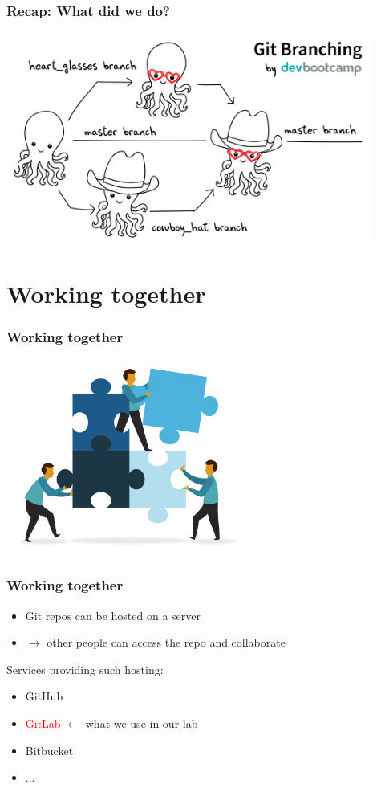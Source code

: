 \documentclass[aspectratio=169]{beamer}
\begin{document}

\begin{frame}
\frametitle{Recap: What did we do?}
\centering
\includegraphics[width=0.9\textwidth]{graphics/git_branching_octopus.png}
\end{frame}


\section{Working together}

\begin{frame}
\frametitle{Working together}
\centering
\includegraphics[width=0.6\textwidth]{graphics/collaboration.png}
\end{frame}


\begin{frame}
\frametitle{Working together}
\begin{itemize}
	\item Git repos can be hosted on a server
	\item $\rightarrow$ other people can access the repo and collaborate
\end{itemize}
\vspace{.5cm}
Services providing such hosting:
\begin{itemize}
	\item GitHub
	\item \textcolor{red}{GitLab} {\footnotesize  $\leftarrow$ what we use in our lab}
	\item Bitbucket
	\item ...
\end{itemize}
\end{frame}
\end{document}

